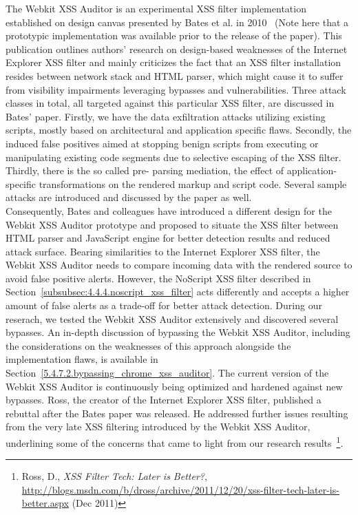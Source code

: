     The Webkit XSS Auditor is an experimental XSS filter implementation established on design canvas presented by Bates et al. in 2010~\cite{bates2010regular} (Note here that a prototypic implementation was available prior to the release of the paper). This publication outlines authors' research on design-based weaknesses of the Internet Explorer XSS filter and mainly criticizes the fact that an XSS filter installation resides between network stack and HTML parser, which might cause it to suffer from visibility impairments leveraging bypasses and vulnerabilities. Three attack classes in total, all targeted against this particular XSS filter, are discussed in Bates' paper. Firstly, we have the data exfiltration attacks utilizing existing scripts, mostly based on architectural and application specific flaws. Secondly, the induced false positives aimed at stopping benign scripts from executing or manipulating existing code segments due to selective escaping of the XSS filter. Thirdly, there is the so called pre-
parsing mediation, the effect of application-specific transformations on the rendered markup and script code. Several sample attacks are introduced and discussed by the paper as well.\\

    Consequently, Bates and colleagues have introduced a different design for the Webkit XSS Auditor prototype and proposed to situate the XSS filter between HTML parser and JavaScript engine for better detection results and reduced attack surface. Bearing similarities to the Internet Explorer XSS filter, the Webkit XSS Auditor needs to compare incoming data with the rendered source to avoid false positive alerts. However, the NoScript XSS filter described in Section~\ref{subsubsec:4.4.4.noscript_xss_filter} acts differently and accepts a higher amount of false alerts as a trade-off for better attack detection. During our reserach, we tested the Webkit XSS Auditor extensively and discovered several bypasses. An in-depth discussion of bypassing the Webkit XSS Auditor, including the considerations on the weaknesses of this approach alongside the implementation flaws, is available in Section~\ref{5.4.7.2.bypassing_chrome_xss_auditor}. The current version of the Webkit XSS Auditor is continuously being optimized 
and hardened against new bypasses. Ross, the creator of the Internet Explorer XSS filter, published a rebuttal after the Bates paper was released. He addressed further issues resulting from the very late XSS filtering introduced by the Webkit XSS Auditor, underlining some of the concerns that came to light from our research results~\footnote{Ross, D., \textit{XSS Filter Tech: Later is Better?}, \url{http://blogs.msdn.com/b/dross/archive/2011/12/20/xss-filter-tech-later-is-better.aspx} (Dec 2011)}.

